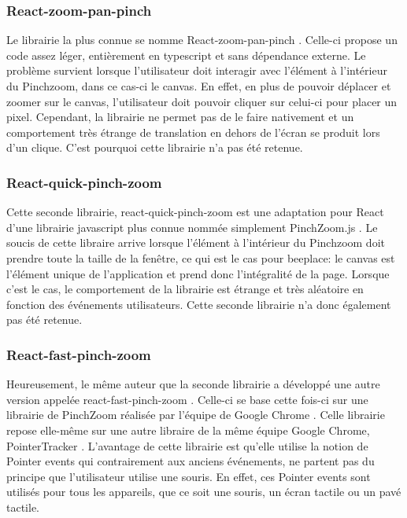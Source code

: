 \subsubsection{React-zoom-pan-pinch}

Le librairie la plus connue se nomme React-zoom-pan-pinch \cite{react-zoom-pan-pinch}. Celle-ci propose un code assez léger, entièrement en \gls{typescript} et sans dépendance externe. Le problème survient lorsque l'utilisateur doit interagir avec l'élément à l'intérieur du Pinchzoom, dans ce cas-ci le canvas. En effet, en plus de pouvoir déplacer et zoomer sur le canvas, l'utilisateur doit pouvoir cliquer sur celui-ci pour placer un pixel. Cependant, la librairie ne permet pas de le faire nativement et un comportement très étrange de translation en dehors de l'écran se produit lors d'un clique. C'est pourquoi cette librairie n'a pas été retenue.

\subsubsection{React-quick-pinch-zoom}

Cette seconde librairie, react-quick-pinch-zoom \cite{react-quick-pinch-zoom} est une adaptation pour React d'une librairie \gls{javascript} plus connue nommée simplement PinchZoom.js \cite{pinchzoomjs}. Le soucis de cette libraire arrive lorsque l'élément à l'intérieur du Pinchzoom doit prendre toute la taille de la fenêtre, ce qui est le cas pour \gls{beeplace}: le canvas est l'élément unique de l'application et prend donc l'intégralité de la page. Lorsque c'est le cas, le comportement de la librairie est étrange et très aléatoire en fonction des événements utilisateurs. Cette seconde librairie n'a donc également pas été retenue.

\subsubsection{React-fast-pinch-zoom}

Heureusement, le même auteur que la seconde librairie a développé une autre version appelée react-fast-pinch-zoom \cite{react-fast-pinch-zoom}. Celle-ci se base cette fois-ci sur une librairie de PinchZoom réalisée par l'équipe de Google Chrome \cite{pinch-zoom-googlechromelabs}. Celle librairie repose elle-même sur une autre libraire de la même équipe Google Chrome, PointerTracker \cite{pointer-tracker}. L'avantage de cette librairie est qu'elle utilise la notion de Pointer events \cite{pointer-events} qui contrairement aux anciens événements, ne partent pas du principe que l'utilisateur utilise une souris. En effet, ces Pointer events sont utilisés pour tous les appareils, que ce soit une souris, un écran tactile ou un pavé tactile.

